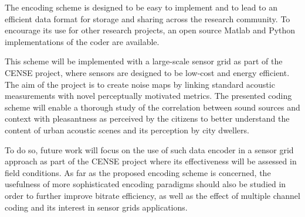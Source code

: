\documentclass[sensors,article,accept,moreauthors,pdftex,10pt,a4paper]{mdpi}
\providecommand{\DIFaddbegin}{} %
\providecommand{\DIFaddend}{} %
\providecommand{\DIFdelbegin}{} %
\providecommand{\DIFdelend}{} %
\begin{document}
\DIFdelend %
The encoding scheme is designed to be easy to implement and to lead to an efficient data format for storage and sharing across the research community. To encourage its use for other research projects, an open source Matlab and Python implementations of the coder are available.

This scheme will be implemented with a large-scale sensor grid as part of the CENSE project, where sensors are designed to be low-cost and energy efficient. The aim of the project is to create noise maps by linking standard acoustic measurements with novel perceptually motivated metrics. The presented coding scheme will enable a thorough study of the correlation between sound sources and context with pleasantness as perceived by the citizens to better understand the content of urban acoustic scenes and its perception by city dwellers.

To do so, future work will focus on the use of such data encoder in a sensor grid approach as part of the CENSE project where its effectiveness will be assessed in field conditions. As far as the proposed encoding scheme is concerned, the usefulness of more sophisticated encoding paradigms should also be studied in order to further improve bitrate efficiency, as well as the effect of multiple channel coding and its interest in sensor grids applications.

\vspace{6pt} 

\DIFdelbegin %
\DIFdelend %
\DIFaddbegin {}
\DIFaddend 
\end{document}
